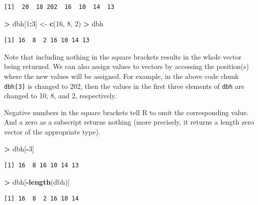 \documentclass[]{krantz}
\makeatletter
\newenvironment{Shaded}{\begin{snugshade}}{\end{snugshade}}
\newcommand{\DecValTok}[1]{\textcolor[rgb]{0.06,0.06,0.06}{#1}}
\newcommand{\KeywordTok}[1]{\textcolor[rgb]{0.27,0.27,0.27}{\textbf{#1}}}
\newcommand{\NormalTok}[1]{#1}
\newcommand{\OperatorTok}[1]{\textcolor[rgb]{0.43,0.43,0.43}{\textbf{#1}}}
\newcommand{\StringTok}[1]{\textcolor[rgb]{0.5,0.5,0.5}{#1}}
\newenvironment{kframe}{%
\medskip{}
\setlength{\fboxsep}{.8em}
 \def\at@end@of@kframe{}%
 \ifinner\ifhmode%
  \def\at@end@of@kframe{\end{minipage}}%
  \begin{minipage}{\columnwidth}%
 \fi\fi%
 \def\FrameCommand##1{\hskip\@totalleftmargin \hskip-\fboxsep
 \colorbox{shadecolor}{##1}\hskip-\fboxsep
     \hskip-\linewidth \hskip-\@totalleftmargin \hskip\columnwidth}%
 \MakeFramed {\advance\hsize-\width
   \@totalleftmargin\z@ \linewidth\hsize
   \@setminipage}}%
 {\par\unskip\endMakeFramed%
 \at@end@of@kframe}
\renewenvironment{Shaded}{\begin{kframe}}{\end{kframe}}
\makeatother
\begin{document}
\begin{verbatim}
[1]  20  18 202  16  10  14  13
\end{verbatim}

\begin{Shaded}
\begin{Highlighting}[]
\OperatorTok{>}\StringTok{ }\NormalTok{dbh[}\DecValTok{1}\OperatorTok{:}\DecValTok{3}\NormalTok{] <-}\StringTok{ }\KeywordTok{c}\NormalTok{(}\DecValTok{16}\NormalTok{, }\DecValTok{8}\NormalTok{, }\DecValTok{2}\NormalTok{)}
\OperatorTok{>}\StringTok{ }\NormalTok{dbh}
\end{Highlighting}
\end{Shaded}

\begin{verbatim}
[1] 16  8  2 16 10 14 13
\end{verbatim}

Note that including nothing in the square brackets results in the whole vector being returned. We can also assign values to vectors by accessing the position(s) where the new values will be assigned. For example, in the above code chunk \texttt{dbh{[}3{]}} is changed to 202, then the values in the first three elements of \texttt{dbh} are changed to 10, 8, and 2, respectively.

Negative numbers in the square brackets tell R to omit the corresponding value. And a zero as a subscript returns nothing (more precisely, it returns a length zero vector of the appropriate type).

\begin{Shaded}
\begin{Highlighting}[]
\OperatorTok{>}\StringTok{ }\NormalTok{dbh[}\OperatorTok{-}\DecValTok{3}\NormalTok{]}
\end{Highlighting}
\end{Shaded}

\begin{verbatim}
[1] 16  8 16 10 14 13
\end{verbatim}

\begin{Shaded}
\begin{Highlighting}[]
\OperatorTok{>}\StringTok{ }\NormalTok{dbh[}\OperatorTok{-}\KeywordTok{length}\NormalTok{(dbh)]}
\end{Highlighting}
\end{Shaded}

\begin{verbatim}
[1] 16  8  2 16 10 14
\end{verbatim}
\end{document}
